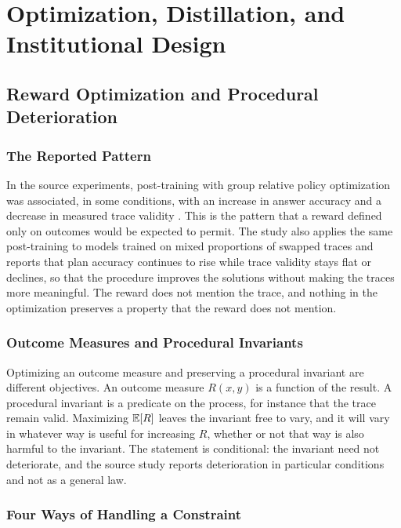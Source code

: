 \part{Optimization, Distillation, and Institutional Design}
\label{part:institutions}

\chapter{Reward Optimization and Procedural Deterioration}
\label{ch:reward}

\section{The Reported Pattern}

In the source experiments, post-training with group relative policy optimization \cite{shao2024} was associated, in some conditions, with an increase in answer accuracy and a decrease in measured trace validity \cite{valmeekam2026}. This is the pattern that a reward defined only on outcomes would be expected to permit. The study also applies the same post-training to models trained on mixed proportions of swapped traces and reports that plan accuracy continues to rise while trace validity stays flat or declines, so that the procedure improves the solutions without making the traces more meaningful. The reward does not mention the trace, and nothing in the optimization preserves a property that the reward does not mention.

\section{Outcome Measures and Procedural Invariants}

Optimizing an outcome measure and preserving a procedural invariant are different objectives. An outcome measure $R(x,y)$ is a function of the result. A procedural invariant is a predicate on the process, for instance that the trace remain valid. Maximizing $\mathbb{E}[R]$ leaves the invariant free to vary, and it will vary in whatever way is useful for increasing $R$, whether or not that way is also harmful to the invariant. The statement is conditional: the invariant need not deteriorate, and the source study reports deterioration in particular conditions and not as a general law.

\section{Four Ways of Handling a Constraint}

